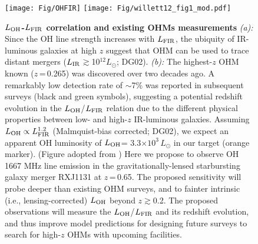 \documentclass[letterpaper,11pt]{article}
\newcommand{\Lsun}{\mbox{$L_{\odot}$}\xspace}
\newcommand{\LFIR}{\mbox{$L_{\rm FIR}$}\xspace}
\newcommand{\LOH}{$L_{\rm OH}$\xspace}
\newcommand{\E}[1]{\mbox{$\times10^{#1}$}}
\newcommand{\eq}{\,=\,}
\newcommand{\obs}{observations\xspace}
\begin{document}
\begin{figure}[ptbh]
\texttt{[image: Fig/OHFIR]} \hspace{-1.25em}
\texttt{[image: Fig/willett12\_fig1\_mod.pdf]}
\caption{{\bf \LOH-\LFIR correlation and existing OHMs measurements}
{\it (a):} Since the OH line strength increases with \LFIR,
the ubiquity of IR-luminous galaxies at high $z$ suggest that OHM can be used to trace distant mergers 
($L_{\rm IR}$$\gtrsim$10$^{12}$\Lsun; DG02).
{\it (b):} The highest-$z$ OHM known ($z$\eq0.265) was discovered over two decades ago. 
A remarkably low detection rate of $\sim$7\% was reported in subsequent surveys (black and green symbols), 
suggesting a potential redshift evolution in the \LOH/\LFIR relation
due to the different physical properties between low- and high-$z$ IR-luminous galaxies.
Assuming $L_{\rm OH}\propto L_{\rm FIR}^{1.2}$ (Malmquist-bias corrected; DG02), 
we expect an apparent OH luminosity of \LOH= 3.3\E{3}\,\Lsun in our target (orange marker). (Figure adopted from 
\citealt{Willett12a})
Here we propose to observe OH 1667 MHz line emission in the gravitationally-lensed starbursting 
galaxy merger RXJ1131 at $z$\eq0.65.
The proposed sensitivity will
probe deeper than existing OHM surveys, and to fainter intrinsic (i.e., lensing-corrected) \LOH beyond $z$$\gtrsim$0.2.
The proposed \obs will measure the \LOH/\LFIR 
and its redshift evolution, and thus improve model predictions for designing 
future surveys to search for high-$z$ OHMs with upcoming facilities. 
\label{fig:model}}
\end{figure}
\end{document}
